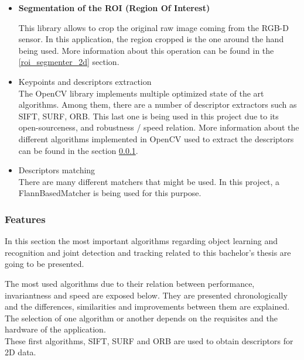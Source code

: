 \begin{itemize}
	\item\textbf{Segmentation of the ROI (Region Of Interest)\\ }

	This library allows to crop the original raw image coming
	from the RGB-D sensor. In this application, the region cropped is the one around the hand being used. More information about this operation can be found in the \ref{roi_segmenter_2d} section. 
	

	\item {Keypoints and descriptors extraction\\ }
	 The OpenCV library implements multiple optimized state of the art algorithms. Among them, there are a number of descriptor extractors such as SIFT, SURF, ORB. This last one is being used in this project due to its open-sourceness, and robustness / speed relation. More information about the different algorithms implemented in OpenCV used to extract the descriptors can be found in the section \ref{features}.


	\item {Descriptors matching\\ } There are many different matchers that might be used. In this project, a FlannBasedMatcher
	is being used for this purpose. 
\end{itemize}



\subsubsection{Features}
\label{features}
In this section the most important algorithms regarding object learning and recognition and joint detection and tracking related to this bachelor's thesis are going to be presented.

The most used algorithms due to their relation between performance, invariantness and speed are exposed below. They are presented chronologically and the differences, similarities and improvements between them are explained. 
\\

The selection of one algorithm or another depends on the requisites and the hardware of the application.
\\

These first algorithms, SIFT, SURF and ORB are used to obtain descriptors for 2D data. 

		
		
		



